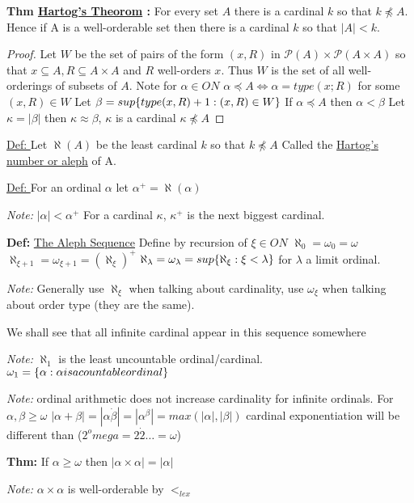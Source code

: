 \textbf{Thm \underline{Hartog's Theorom} : } For every set $A$ there is a cardinal $k$ so that $k \npreceq A.$
Hence if A is a well-orderable set then there is a cardinal $k$ so that $|A| < k$.

\begin{proof}
    Let $W$ be the set of pairs of the form $(x,R)$ in $\mathcal{P}(A) \times \mathcal{P}(A \times A)$ so that $x \subseteq A, R \subseteq A \times A$
    and $R$ well-orders $x$.
    Thus $W$ is the set of all well-orderings of subsets of $A$.
    Note for $\alpha \in ON$
    $\alpha \preceq A \iff \alpha = type(x;R)$ for some $(x,R) \in W$
    Let $\beta = sup \{type(x,R) + 1 : (x,R) \in W\}$
    If $\alpha \preceq A$ then $\alpha < \beta$
    Let $\kappa = |\beta|$ then $\kappa \approx \beta$, $\kappa$ is a cardinal
    $\kappa \npreceq A$
\end{proof}

\underline{Def: } Let $\aleph(A)$ be the least cardinal $k$ so that $k \npreceq A$
Called the \underline{Hartog's number or aleph} of A.

\underline{Def: } For an ordinal $\alpha$ let $\alpha^+ = \aleph(\alpha)$

\emph{Note: } $|\alpha| < \alpha^+$
For a cardinal $\kappa$, $\kappa^+$ is the next biggest cardinal.

\textbf{Def: } \underline{The Aleph Sequence}
Define by recursion of $\xi \in ON$
$\aleph_0 = \omega_0 = \omega$
$\aleph_{\xi+1} = \omega_{\xi + 1} = (\aleph_\xi)^+$
$\aleph_\lambda = \omega_\lambda = sup \{\aleph_\xi : \xi < \lambda\}$ for $\lambda$ a limit ordinal.

\emph{Note:} Generally use $\aleph_\xi$ when talking about cardinality, use $\omega_\xi$ when talking about order type (they are the same).

We shall see that all infinite cardinal appear in this sequence somewhere

\emph{Note:} $\aleph_1$ is the least uncountable ordinal/cardinal.
$\omega_1 = \{\alpha : \alpha is a countable ordinal\}$

\emph{Note:} ordinal arithmetic does not increase cardinality for infinite ordinals.
For $\alpha, \beta \geq \omega$
$|\alpha + \beta| = |\alpha \dot \beta| = |\alpha^\beta| = max(|\alpha|,|\beta|)$
cardinal exponentiation will be different than ($2^omega = 2 \dot 2 \dots = \omega$)

\textbf{Thm:} If $\alpha \geq \omega$ then $|\alpha \times \alpha| = |\alpha|$

\emph{Note:} $\alpha \times \alpha$ is well-orderable by $<_{lex}$

